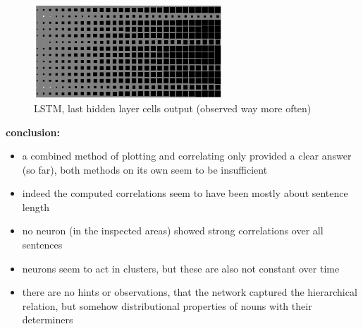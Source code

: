 \begin{frame}{\expvi}
	\begin{figure}
		\includegraphics[width=200pt,height=100pt]{gfx/cells1length.png}
		\caption{LSTM, last hidden layer cells output (observed way more often)} %
	\end{figure}
\end{frame}
\begin{frame}{\expvi}
	\textbf{conclusion:}
	\begin{itemize}
		\item a combined method of plotting and correlating only provided a clear answer (so far), both methods on its own seem to be insufficient
		\item indeed the computed correlations seem to have been mostly about sentence length
		\item no neuron (in the inspected areas) showed strong correlations over all sentences
		\item neurons seem to act in clusters, but these are also not constant over time
		\item there are no hints or observations, that the network captured the hierarchical relation, but somehow distributional properties of nouns with their determiners	
	\end{itemize}
\end{frame}
